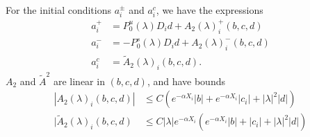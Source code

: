 \documentclass[thesis.tex]{subfiles}
\begin{document}
\begin{lemma}\label{lemma:aipm}
For the initial conditions $a_i^\pm$ and $a_i^c$, we have the expressions
\begin{equation}\label{aipmexp1}
\begin{aligned}
a_i^+ &= P_0^u(\lambda) D_i d + A_2(\lambda)_i^+(b, c, d) \\
a_i^- &= -P_0^s(\lambda) D_i d + A_2(\lambda)_i^-(b, c, d) \\
a_i^c &= \tilde{A}_2(\lambda)_i(b, c, d).
\end{aligned}
\end{equation}
$A_2$ and $\tilde{A}^2$ are linear in $(b, c, d)$, and have bounds
\begin{align}
|A_2(\lambda)_i(b, c, d)|
&\leq C \left(e^{-\alpha X_i}|b| + e^{-\alpha X_i}|c_i| + |\lambda|^2|d| \right) \label{A2bound} \\
|\tilde{A}_2(\lambda)_i(b, c, d) &\leq C |\lambda| e^{-\alpha X_i} \left( e^{-\alpha X_i}  |b| + |c_i| +|\lambda|^2 |d| \right) \label{tildeA2bound}
\end{align}


\end{lemma}
\end{document}
